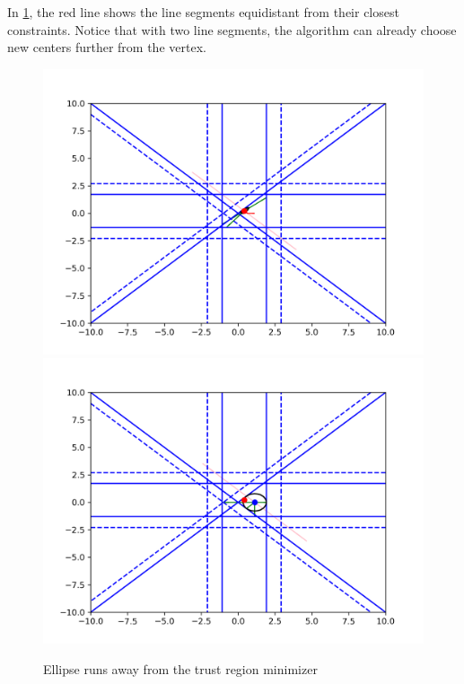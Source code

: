 In \cref{line_can_run}, the red line shows the line segments equidistant from their closest constraints.
Notice that with two line segments, the algorithm can already choose new centers further from the vertex.

\begin{figure}[ht]
    \centering
    \includegraphics[scale=0.4]{images/run_away_1.png}
    \includegraphics[scale=0.4]{images/run_away_2.png}
    \caption{
    Ellipse runs away from the trust region minimizer}
    \label{line_can_run}
\end{figure}

